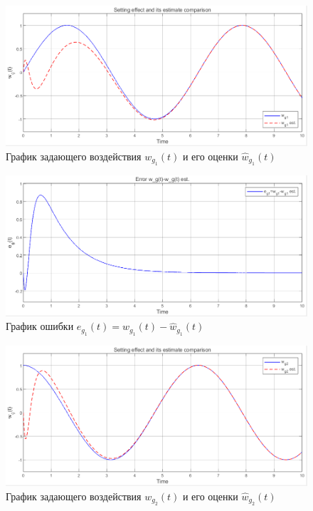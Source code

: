 \documentclass[a4paper, 12pt]{article}
\begin{document}
    \begin{figure}[H]
        \centering
        \includegraphics[scale=0.6]{2task_wghwg1.png}
        \captionsetup{skip=0pt}
        \caption{График задающего воздействия $w_{g_1}(t)$ и его оценки $\hat{w}_{g_1}(t)$}
        \label{fig:2task_wghwg1}
    \end{figure}
    \begin{figure}[H]
        \centering
        \includegraphics[scale=0.6]{2task_eg1.png}
        \captionsetup{skip=0pt}
        \caption{График ошибки $e_{g_1}(t)=w_{g_1}(t)-\hat{w}_{g_1}(t)$}
        \label{fig:2task_eg1}
    \end{figure}
    \begin{figure}[H]
        \centering
        \includegraphics[scale=0.6]{2task_wghwg2.png}
        \captionsetup{skip=0pt}
        \caption{График задающего воздействия $w_{g_2}(t)$ и его оценки $\hat{w}_{g_2}(t)$}
        \label{fig:2task_wghwg2}
    \end{figure}
\end{document}
